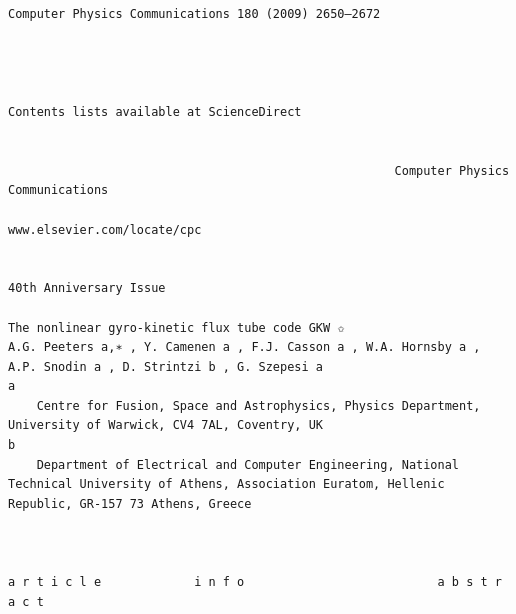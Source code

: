 \documentclass[a4paper]{article}
\newcommand{\gkwpagefont}{\fontsize{6.0pt}{7.55pt}\selectfont}
\begin{document}
\begin{Verbatim}[fontsize=\gkwpagefont]
                                                               Computer Physics Communications 180 (2009) 2650–2672



                                                                    Contents lists available at ScienceDirect


                                                      Computer Physics Communications
                                                                           www.elsevier.com/locate/cpc


40th Anniversary Issue

The nonlinear gyro-kinetic flux tube code GKW ✩
A.G. Peeters a,∗ , Y. Camenen a , F.J. Casson a , W.A. Hornsby a , A.P. Snodin a , D. Strintzi b , G. Szepesi a
a
    Centre for Fusion, Space and Astrophysics, Physics Department, University of Warwick, CV4 7AL, Coventry, UK
b
    Department of Electrical and Computer Engineering, National Technical University of Athens, Association Euratom, Hellenic Republic, GR-157 73 Athens, Greece



a r t i c l e             i n f o                           a b s t r a c t


\end{Verbatim}
\end{document}
